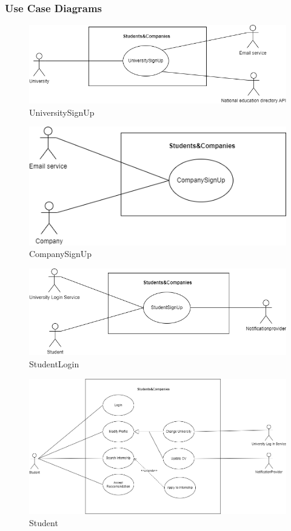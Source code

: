 \documentclass{article}
\begin{document}
\subsubsection{Use Case Diagrams}
\begin{figure}[H]
    \centering
    \includegraphics[scale = 0.45]{figures/UniversityLogin.drawio.png}
    \caption{UniversitySignUp}
    \centering
\end{figure}
\begin{figure}[H]
    \centering
    \includegraphics[scale = 0.45]{figures/use_case_1-CompanyLogin.drawio.png}
    \caption{CompanySignUp}
    \centering
\end{figure}
\begin{figure}[H]
    \centering
    \includegraphics[scale = 0.45]{figures/use_case_1-StudentLogin.drawio.png}
    \caption{StudentLogin}
    \centering
\end{figure}
\begin{figure}[H]
    \centering
    \includegraphics[scale = 0.45]{figures/Student.drawio.png}
    \caption{Student}
    \centering
\end{figure}
\end{document}
